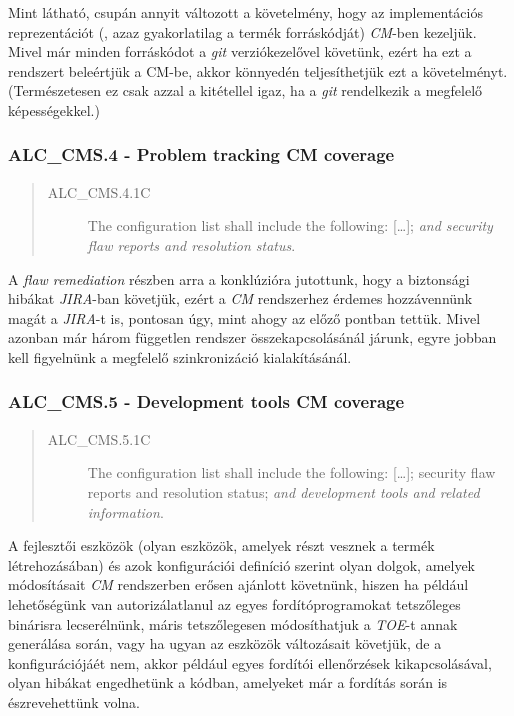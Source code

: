 Mint látható, csupán annyit változott a követelmény, hogy az implementációs reprezentációt (, azaz
gyakorlatilag a termék forráskódját) \emph{CM}-ben kezeljük. Mivel már minden forráskódot
a \emph{git} verziókezelővel követünk, ezért ha ezt a rendszert beleértjük a CM-be, akkor könnyedén
teljesíthetjük ezt a követelményt. (Természetesen ez csak azzal a kitétellel igaz, ha a \emph{git}
rendelkezik a megfelelő képességekkel.)

\pagebreak[3]
\subsubsection{ALC\_CMS.4 - Problem tracking CM coverage}
\begin{quote}
    \begin{description}
        \item[ALC\_CMS.4.1C]{The configuration list shall include the following: [\ldots]; \emph{and
            security flaw reports and resolution status}.}
    \end{description}
\end{quote}

A \emph{flaw remediation} részben arra a konklúzióra jutottunk, hogy a biztonsági hibákat
\emph{JIRA}-ban \cite{JIRA} követjük, ezért a \emph{CM} rendszerhez érdemes hozzávennünk magát
a \emph{JIRA}-t is, pontosan úgy, mint ahogy az előző pontban tettük. Mivel azonban már három
független rendszer összekapcsolásánál járunk, egyre jobban kell figyelnünk a megfelelő
szinkronizáció kialakításánál.

\pagebreak[3]
\subsubsection{ALC\_CMS.5 - Development tools CM coverage}
\begin{quote}
    \begin{description}
        \item[ALC\_CMS.5.1C]{The configuration list shall include the following: [\ldots]; security
            flaw reports and resolution status; \emph{and development tools and related
            information}.}
    \end{description}
\end{quote}

A fejlesztői eszközök (olyan eszközök, amelyek részt vesznek a termék létrehozásában) és azok
konfigurációi definíció szerint olyan dolgok, amelyek módosításait \emph{CM} rendszerben erősen
ajánlott követnünk, hiszen ha például lehetőségünk van autorizálatlanul az egyes fordítóprogramokat
tetszőleges binárisra lecserélnünk, máris tetszőlegesen módosíthatjuk a \emph{TOE}-t annak
generálása során, vagy ha ugyan az eszközök változásait követjük, de a konfigurációjáét nem, akkor
például egyes fordítói ellenőrzések kikapcsolásával, olyan hibákat engedhetünk a kódban, amelyeket
már a fordítás során is észrevehettünk volna.

